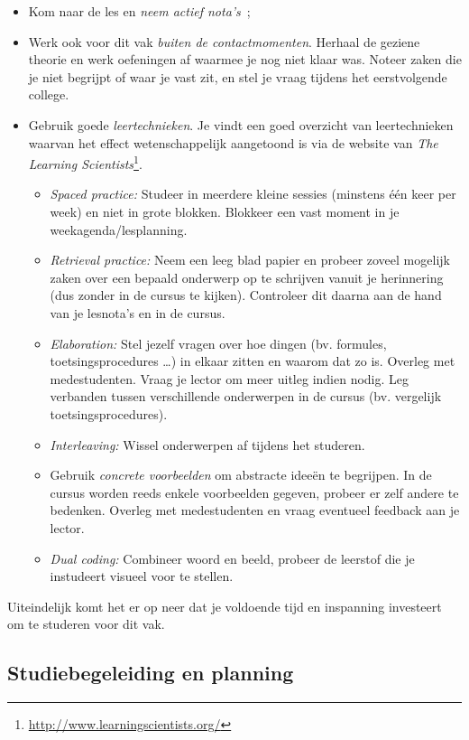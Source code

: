 \begin{itemize}
  \item Kom naar de les en \emph{neem actief nota's}~\parencite{Lundin2020};
  \item Werk ook voor dit vak \emph{buiten de contactmomenten}. Herhaal de geziene theorie en werk oefeningen af waarmee je nog niet klaar was. Noteer zaken die je niet begrijpt of waar je vast zit, en stel je vraag tijdens het eerstvolgende college.
  \item Gebruik goede \emph{leertechnieken}. Je vindt een goed overzicht van leertechnieken waarvan het effect wetenschappelijk aangetoond is via de website van \emph{The Learning Scientists}\footnote{\url{http://www.learningscientists.org/}}.
  \begin{itemize}
    \item \emph{Spaced practice:} Studeer in meerdere kleine sessies (minstens één keer per week) en niet in grote blokken. Blokkeer een vast moment in je weekagenda/lesplanning.
    \item \emph{Retrieval practice:} Neem een leeg blad papier en probeer zoveel mogelijk zaken over een bepaald onderwerp op te schrijven vanuit je herinnering (dus zonder in de cursus te kijken). Controleer dit daarna aan de hand van je lesnota's en in de cursus.
    \item \emph{Elaboration:} Stel jezelf vragen over hoe dingen (bv. formules, toetsingsprocedures \ldots) in elkaar zitten en waarom dat zo is. Overleg met medestudenten. Vraag je lector om meer uitleg indien nodig. Leg verbanden tussen verschillende onderwerpen in de cursus (bv. vergelijk toetsingsprocedures).
    \item \emph{Interleaving:} Wissel onderwerpen af tijdens het studeren.
    \item Gebruik \emph{concrete voorbeelden} om abstracte idee\"en te begrijpen. In de cursus worden reeds enkele voorbeelden gegeven, probeer er zelf andere te bedenken. Overleg met medestudenten en vraag eventueel feedback aan je lector.
    \item \emph{Dual coding:} Combineer woord en beeld, probeer de leerstof die je instudeert visueel voor te stellen.
  \end{itemize}
\end{itemize}

Uiteindelijk komt het er op neer dat je voldoende tijd en inspanning investeert om te studeren voor dit vak.

\subsection{Studiebegeleiding en planning}

